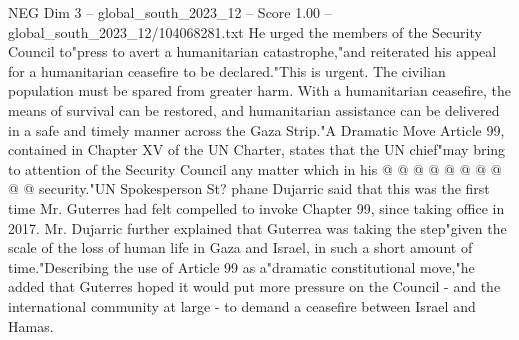 \begin{textsample}{NEG Dim 3 – global\_south\_2023\_12 – Score 1.00 – global\_south\_2023\_12/104068281.txt}
He urged the members of the Security Council to"press to avert a humanitarian catastrophe,"and reiterated his appeal for a humanitarian ceasefire to be declared."This is urgent.
The civilian population must be spared from greater harm.
With a humanitarian ceasefire, the means of survival can be restored, and humanitarian assistance can be delivered in a safe and timely manner across the Gaza Strip."A Dramatic Move Article 99, contained in Chapter XV of the UN Charter, states that the UN chief"may bring to attention of the Security Council any matter which in his @ @ @ @ @ @ @ @ @ @ security."UN Spokesperson St? phane Dujarric said that this was the first time Mr.
Guterres had felt compelled to invoke Chapter 99, since taking office in 2017.
Mr.
Dujarric further explained that Guterrea was taking the step"given the scale of the loss of human life in Gaza and Israel, in such a short amount of time."Describing the use of Article 99 as a"dramatic constitutional move,"he added that Guterres hoped it would put more pressure on the Council - and the international community at large - to demand a ceasefire between Israel and Hamas.

\end{textsample}
